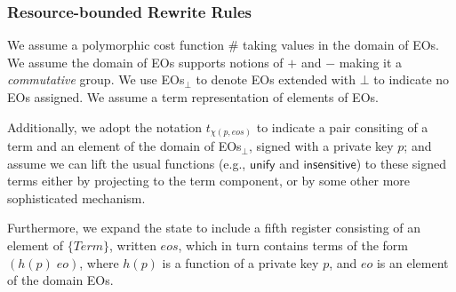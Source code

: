 \subsubsection{Resource-bounded Rewrite Rules}

We assume a polymorphic cost function $\mathsf{\#}$ taking values in the domain of EOs. We assume the domain of EOs supports notions of $+$ and $-$ making it a \emph{commutative} group. We use EOs$_{\bot}$ to denote EOs extended with $\bot$ to indicate no EOs assigned. We assume a term representation of elements of EOs.

Additionally, we adopt the notation $t_{\chi(p,eos)}$ to indicate a pair consiting of a term and an element of the domain of EOs$_{\bot}$, signed with a private key $p$; and assume we can lift the usual functions (e.g., $\mathsf{unify}$ and $\mathsf{insensitive}$) to these signed terms either by projecting to the term component, or by some other more sophisticated mechanism.

Furthermore, we expand the state to include a fifth register consisting of an element of $\{ Term \}$, written $eos$, which in turn contains terms of the form $(h(p)\; eo)$, where $h(p)$ is a function of a private key $p$, and $eo$ is an element of the domain EOs.

